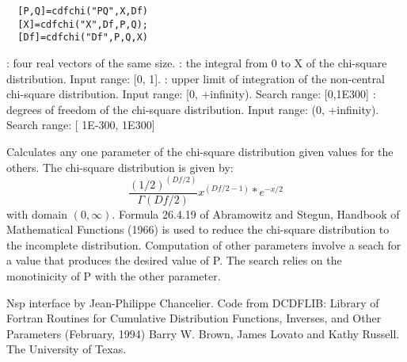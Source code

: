 \begin{mandesc}
\end{mandesc}
\label{cdfchi}
\begin{calling_sequence}
\begin{verbatim}
  [P,Q]=cdfchi("PQ",X,Df)  
  [X]=cdfchi("X",Df,P,Q);  
  [Df]=cdfchi("Df",P,Q,X)  
\end{verbatim}
\end{calling_sequence}
\begin{parameters}
  \begin{varlist}
    : four real vectors of the same size.
    :  the integral from 0 to X of the chi-square distribution. Input range: [0, 1]. 
    : upper limit of integration of the non-central chi-square distribution. Input range: [0, +infinity). Search range: [0,1E300]  
      : degrees of freedom of the chi-square distribution. Input range: (0, +infinity). Search range: [ 1E-300, 1E300]
  \end{varlist}
\end{parameters}
\begin{mandescription}
  Calculates any one parameter of the chi-square 
  distribution given values for the others.
  The chi-square distribution is given by:
  \begin{equation}
    \frac{(1/2)^{(Df/2)}}{\Gamma(Df/2)} x^{(Df/2 -1)} * e^{-x/2} 
  \end{equation}
  with domain $(0,\infty)$.
  Formula    26.4.19   of Abramowitz  and     Stegun, Handbook  of
  Mathematical Functions   (1966) is used   to reduce the chi-square
  distribution to the incomplete distribution.
  Computation of other parameters involve a seach for a value that
  produces  the desired  value  of P.   The search relies  on  the
  monotinicity of P with the other parameter.
\end{mandescription}

\begin{authors}
  Nsp interface by Jean-Philippe Chancelier. Code from DCDFLIB: 
  Library of Fortran Routines for Cumulative Distribution
  Functions, Inverses, and Other Parameters (February, 1994)
  Barry W. Brown, James Lovato and Kathy Russell. The University of Texas.
\end{authors}
